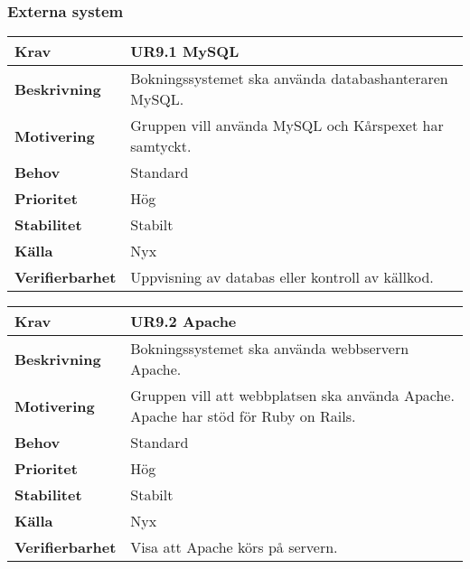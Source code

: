 \documentclass[a4paper, twoside, 11pt, titlepage]{article}
\begin{document}
		\subsubsection{Externa system}


		\begin {table} [ht] \begin{tabular} { p{2.6cm} p{12.5cm} }
			\hline
			{\sffamily\textbf{Krav}} & {\sffamily\textbf{UR9.1 MySQL}} \\
			\hline
			{\sffamily\textbf{Beskrivning}} & {Bokningssystemet ska använda databashanteraren MySQL.} \\
			\hline
			{\sffamily\textbf{Motivering}} & {Gruppen vill använda MySQL och Kårspexet har samtyckt.} \\
			\hline
			{\sffamily\textbf{Behov}} & {Standard} \\
			\hline
			{\sffamily\textbf{Prioritet}} & {Hög} \\
			\hline
			{\sffamily\textbf{Stabilitet}} & {Stabilt} \\
			\hline
			{\sffamily\textbf{Källa}} & {Nyx} \\
			\hline
			{\sffamily\textbf{Verifierbarhet}} & {Uppvisning av databas eller kontroll av källkod.} \\
			\hline
		\end{tabular} \end{table} \FloatBarrier
		\vspace{6mm}

		\begin {table} [ht] \begin{tabular} { p{2.6cm} p{12.5cm} }
			\hline
			{\sffamily\textbf{Krav}} & {\sffamily\textbf{UR9.2 Apache}} \\
			\hline
			{\sffamily\textbf{Beskrivning}} & {Bokningssystemet ska använda webbservern Apache.} \\
			\hline
			{\sffamily\textbf{Motivering}} & {Gruppen vill att webbplatsen ska använda Apache. Apache har stöd för Ruby on Rails.} \\
			\hline
			{\sffamily\textbf{Behov}} & {Standard} \\
			\hline
			{\sffamily\textbf{Prioritet}} & {Hög} \\
			\hline
			{\sffamily\textbf{Stabilitet}} & {Stabilt} \\
			\hline
			{\sffamily\textbf{Källa}} & {Nyx} \\
			\hline
			{\sffamily\textbf{Verifierbarhet}} & {Visa att Apache körs på servern.} \\
			\hline
		\end{tabular} \end{table} \FloatBarrier
		\vspace{6mm}
\end{document}
